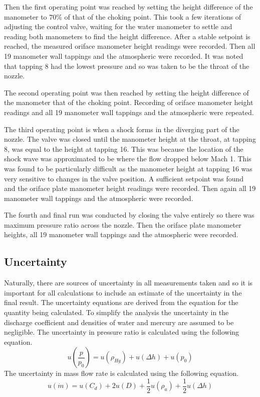 \documentclass{article}
\begin{document}
Then the first operating point was reached by setting the height difference of the manometer to $70\%$ of that of the choking point.
This took a few iterations of adjusting the control valve, waiting for the water manometer to settle and reading both manometers to find the height difference.
After a stable setpoint is reached, the measured oriface manometer height readings were recorded. 
Then all 19 manometer wall tappings and the atmospheric were recorded.
It was noted that tapping 8 had the lowest pressure and so was taken to be the throat of the nozzle.

The second operating point was then reached by setting the height difference of the manometer that of the choking point.
Recording of oriface manometer height readings and all 19 manometer wall tappings and the atmospheric were repeated.

The third operating point is when a shock forms in the diverging part of the nozzle. The valve was closed until the manometer height at the throat, at tapping 8, was equal to the height at tapping 16.
This was because the location of the shock wave was approximated to be where the flow dropped below Mach 1.
This was found to be particularly difficult as the manometer height at tapping 16 was very sensitive to changes in the valve position.
A sufficient setpoint was found and the oriface plate manometer height readings were recorded.
Then again all 19 manometer wall tappings and the atmospheric were recorded.

The fourth and final run was conducted by closing the valve entirely so there was maximum pressure ratio across the nozzle.
Then the oriface plate manometer heights, all 19 manometer wall tappings and the atmospheric were recorded.

\subsection{Uncertainty}

Naturally, there are sources of uncertainty in all measurements taken and so it is important for all calculations to include an estimate of the uncertainty in the final result.
The uncertainty equations are derived from the equation for the quantity being calculated.
To simplify the analysis the uncertainty in the discharge coefficient and densities of water and mercury are assumed to be negligible.
The uncertainty in pressure ratio is calculated using the following equation.
\begin{equation}
    u\left( \frac{p}{p_0} \right) = u(\rho_{Hg}) + u(\Delta h) + u(p_0)
\end{equation}
The uncertainty in mass flow rate is calculated using the following equation.
\begin{equation}
    u(\dot{m}) = u(C_d) + 2u(D) + \frac{1}{2}u(\rho_a) + \frac{1}{2}u(\Delta h)
\end{equation}
\end{document}
